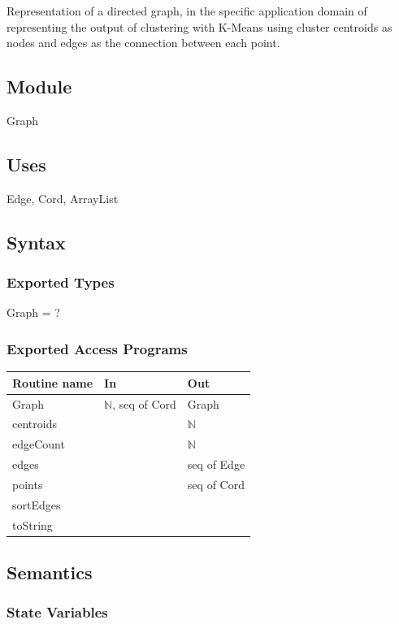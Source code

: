 \documentclass[12pt]{article}
\begin{document}
Representation of a directed graph, in the specific application domain of representing
the output of clustering with K-Means using cluster centroids as nodes and edges as
the connection between each point.

\subsection*{Module}

Graph

\subsection* {Uses}

Edge, Cord, ArrayList

\subsection* {Syntax}

\subsubsection* {Exported Types}

Graph = ?

\subsubsection* {Exported Access Programs}

\begin{tabular}{| l | l | l |}
\hline
\textbf{Routine name} & \textbf{In} & \textbf{Out}\\
\hline
Graph & $\mathbb{N}$, seq of Cord & Graph\\
\hline
centroids & ~ & $\mathbb{N}$\\
\hline
edgeCount & ~ & $\mathbb{N}$\\
\hline
edges & ~ & seq of Edge\\
\hline
points & ~ & seq of Cord \\
\hline
sortEdges & ~ & ~ \\
\hline
toString & ~ & ~ \\
\hline
\end{tabular}

\subsection* {Semantics}

\subsubsection* {State Variables}
\end{document}
